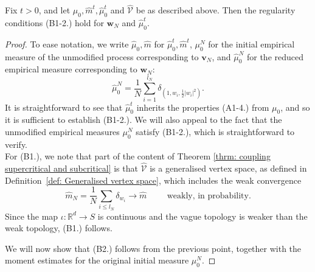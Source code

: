 \begin{lemma}\label{lemma: conditions B1-3 for duality} Fix $t>0$, and let $\mu_0, \widehat{m}^t, \widehat{\mu}^t_0$ and $\widehat{\mathcal{V}}$ be as described above. Then the regularity conditions (B1-2.) hold for $\mathbf{w}_N$ and $\widehat{\mu}^t_0.$ \end{lemma} \begin{proof} To ease notation, we write $\widehat{\mu}_0, \widehat{m}$ for $\widehat{\mu}^t_0, \widehat{m}^t$, $\mu^N_0$ for the initial empirical measure of the unmodified process corresponding to $\mathbf{v}_N$, and $\widehat{\mu}^N_0$ for the reduced empirical measure corresponding to $\mathbf{w}_N$: \begin{equation} \widehat{\mu}^N_0 =\frac{1}{N}\sum_{i=1}^{l_N} \delta_{(1,w_i, \frac{1}{2}|w_i|^2)}.\end{equation} It is straightforward to see that $\widehat{\mu}^t_0$ inherits the properties (A1-4.) from $\mu_0$, and so it is sufficient to establish (B1-2.). We will also appeal to the fact that the unmodified empirical measures $\mu^N_0$ satisfy (B1-2.), which is straightforward to verify. \medskip \\ For (B1.), we note that part of the content of Theorem \ref{thrm: coupling supercritical and subcritical} is that $\widehat{\mathcal{V}}$ is a generalised vertex space, as defined in Definition~\ref{def: Generalised vertex space}, which includes the weak convergence
\begin{equation}
    \widehat{m}_N=\frac{1}{N}\sum_{i\le l_N} \delta_{w_i} \rightarrow \widehat{m} \hspace{1cm}\text{weakly, in probability}.
\end{equation} Since the map $\iota: \mathbb{R}^d\rightarrow S$ is continuous and the vague topology is weaker than the weak topology, (B1.) follows.

We will now show that (B2.) follows from the previous point, together with the moment estimates for the original initial measure $\mu^N_0$. 


\end{proof}
